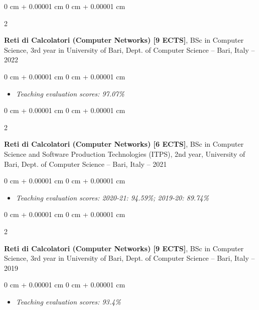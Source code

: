 \documentclass[10pt, a4paper]{article}
\newenvironment{highlights}{
    \begin{itemize}[
        topsep=0.10 cm,
        parsep=0.10 cm,
        partopsep=0pt,
        itemsep=0pt,
        leftmargin=0 cm + 10pt
    ]
}{
    \end{itemize}
} %
\newenvironment{onecolentry}{
    \begin{adjustwidth}{
        0 cm + 0.00001 cm
    }{
        0 cm + 0.00001 cm
    }
}{
    \end{adjustwidth}
} %
\newenvironment{twocolentry}[2][]{
    \onecolentry
    \def\secondColumn{#2}
    \setcolumnwidth{\fill, 4.5 cm}
    \begin{paracol}{2}
}{
    \switchcolumn \raggedleft \secondColumn
    \end{paracol}
    \endonecolentry
} %
\begin{document}
        \begin{twocolentry}{
            2021 – 2022
        }
            \textbf{Reti di Calcolatori (Computer Networks) [9 ECTS]}, BSc in Computer Science, 3rd year in University of Bari, Dept. of Computer Science -- Bari, Italy\end{twocolentry}

        \vspace{0.10 cm}
        \begin{onecolentry}
            \begin{highlights}
                \item \textit{Teaching evaluation scores: 97.07\%}
            \end{highlights}
        \end{onecolentry}


        \vspace{0.2 cm}

        \begin{twocolentry}{
            2019 – 2021
        }
            \textbf{Reti di Calcolatori (Computer Networks) [6 ECTS]}, BSc in Computer Science and Software Production Technologies (ITPS), 2nd year, University of Bari, Dept. of Computer Science -- Bari, Italy\end{twocolentry}

        \vspace{0.10 cm}
        \begin{onecolentry}
            \begin{highlights}
                \item \textit{Teaching evaluation scores: 2020-21: 94.59\%; 2019-20: 89.74\%}
            \end{highlights}
        \end{onecolentry}


        \vspace{0.2 cm}

        \begin{twocolentry}{
            2018 – 2019
        }
            \textbf{Reti di Calcolatori (Computer Networks) [9 ECTS]}, BSc in Computer Science, 3rd year in University of Bari, Dept. of Computer Science -- Bari, Italy\end{twocolentry}

        \vspace{0.10 cm}
        \begin{onecolentry}
            \begin{highlights}
                \item \textit{Teaching evaluation scores: 93.4\%}
            \end{highlights}
        \end{onecolentry}
\end{document}
